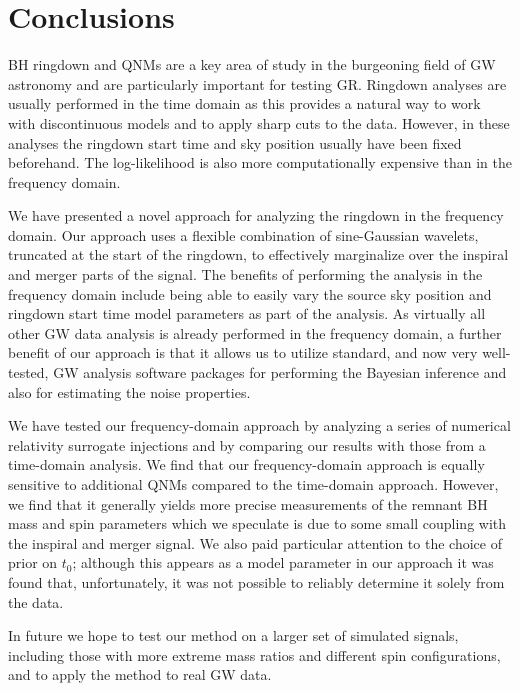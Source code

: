\section{Conclusions}\label{ch3:sec:discussion}

BH ringdown and QNMs are a key area of study in the burgeoning field of GW astronomy and are particularly important for testing GR.
Ringdown analyses are usually performed in the time domain as this provides a natural way to work with discontinuous models and to apply sharp cuts to the data. 
However, in these analyses the ringdown start time and sky position usually have been fixed beforehand.
The log-likelihood is also more computationally expensive than in the frequency domain.

We have presented a novel approach for analyzing the ringdown in the frequency domain. 
Our approach uses a flexible combination of sine-Gaussian wavelets, truncated at the start of the ringdown, to effectively marginalize over the inspiral and merger parts of the signal. 
The benefits of performing the analysis in the frequency domain include being able to easily vary the source sky position and ringdown start time model parameters as part of the analysis.
As virtually all other GW data analysis is already performed in the frequency domain, a further benefit of our approach is that it allows us to utilize standard, and now very well-tested, GW analysis software packages for performing the Bayesian inference and also for estimating the noise properties.

We have tested our frequency-domain approach by analyzing a series of numerical relativity surrogate injections and by comparing our results with those from a time-domain analysis. 
We find that our frequency-domain approach is equally sensitive to additional QNMs compared to the time-domain approach.
However, we find that it generally yields more precise measurements of the remnant BH mass and spin parameters which we speculate is due to some small coupling with the inspiral and merger signal.
We also paid particular attention to the choice of prior on $t_0$; although this appears as a model parameter in our approach it was found that, unfortunately, it was not possible to reliably determine it solely from the data.

In future we hope to test our method on a larger set of simulated signals, including those with more extreme mass ratios and different spin configurations, and to apply the method to real GW data.
